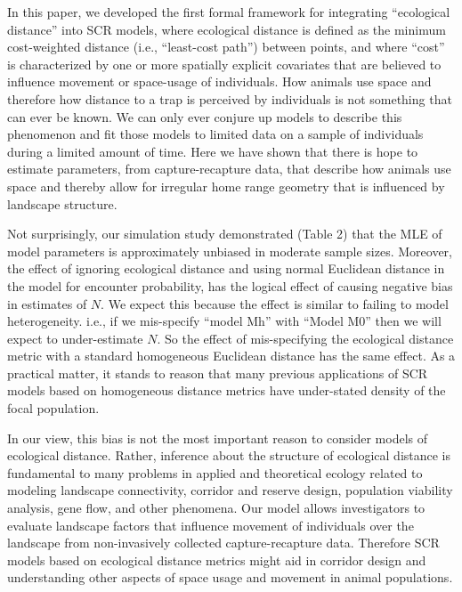 \documentclass[12pt]{article}
\begin{document}
\begin{spacing}{1.8}
In this paper, we developed the first formal framework for integrating
``ecological distance'' into SCR models, where ecological distance is
defined as the minimum cost-weighted distance (i.e., ``least-cost
path'') between points, and where ``cost'' is characterized by one or
more spatially explicit covariates that are believed to influence
movement or space-usage of individuals.
How animals use space and therefore how distance to a trap is
perceived by individuals is not something that can ever be known. We
can only ever conjure up models to describe this phenomenon and fit
those models to limited data on a sample of individuals during a
limited amount of time.  Here we have shown that there is hope to
estimate parameters, from capture-recapture data, that describe how
animals use space and thereby allow for irregular home range geometry
that is influenced by landscape structure.

Not surprisingly, our simulation study demonstrated
(Table 2) that the MLE of model parameters is
approximately unbiased in moderate sample sizes. Moreover, the effect
of ignoring ecological distance and using normal Euclidean distance in
the model for encounter probability, has the logical effect of causing
negative bias in estimates of $N$.  We expect this because the effect
is similar to failing to model heterogeneity. i.e., if we mis-specify
``model Mh'' with ``Model M0''
\citep{otis_etal:1978} then we will expect to under-estimate $N$. So
the effect of mis-specifying the ecological distance metric with a
standard homogeneous Euclidean distance has the same effect. As a
practical matter, it stands to reason that many previous applications
of SCR models based on homogeneous distance metrics have under-stated
density of the focal population.

In our view, this bias is not the most important reason to
consider models of ecological distance. Rather, inference about the
structure of ecological distance is fundamental to many problems in
applied and theoretical ecology related to modeling landscape
connectivity, corridor and reserve design, population viability
analysis, gene flow, and other phenomena.  Our  model allows
investigators to evaluate landscape factors that influence movement of
individuals over the landscape from non-invasively collected
capture-recapture data.  Therefore SCR models based on ecological
distance metrics might aid in corridor design and understanding other
aspects of space usage and movement in animal populations.


\end{spacing}
\end{document}
